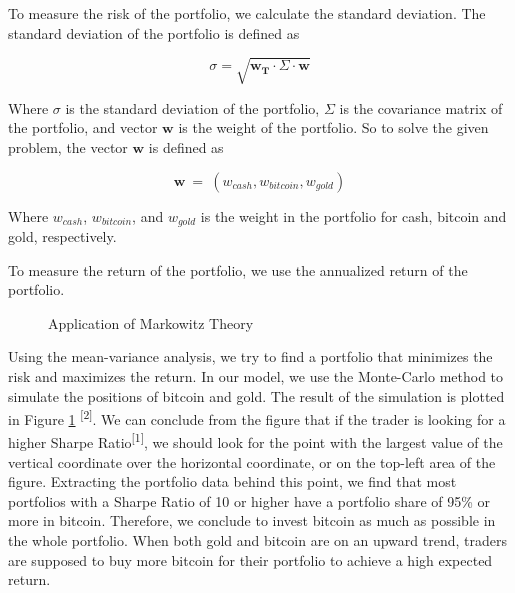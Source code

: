 \documentclass[12pt,a4paper]{article}
\begin{document}
\begin{spacing}{1.2}
To measure the risk of the portfolio, we calculate the standard deviation. The standard deviation of the portfolio is defined as

$$
	\sigma = \sqrt{\mathbf{w_T}  \cdot \Sigma \cdot \mathbf{w}}
$$

Where $\sigma$ is the standard deviation of the portfolio, $\Sigma$ is the covariance matrix of the portfolio, and vector $\mathbf{w}$ is the weight of the portfolio. So to solve the given problem, the vector $\mathbf{w}$ is defined as 

$$
\mathbf{w} \ = \ (w_{cash},w_{bitcoin},w_{gold})
$$

Where $w_{cash}$, $w_{bitcoin}$, and $w_{gold}$ is the weight in the portfolio for cash, bitcoin and gold, respectively. 

To measure the return of the portfolio, we use the annualized return of the portfolio.

\begin{figure}[H]
	\caption{Application of Markowitz Theory}
	\label{figure:markowiz}
\end{figure}

Using the mean-variance analysis, we try to find a portfolio that minimizes the risk and maximizes the return. In our model, we use the Monte-Carlo method to simulate the positions of bitcoin and gold. The result of the simulation is plotted in Figure \ref{figure:markowiz} \textsuperscript{[2]}.
We can conclude from the figure that if the trader is looking for a higher Sharpe Ratio\textsuperscript{[1]}, we should look for the point with the largest value of the vertical coordinate over the horizontal coordinate, or on the top-left area of the figure.
Extracting the portfolio data behind this point, we find that most portfolios with a Sharpe Ratio of 10 or higher have a portfolio share of 95\% or more in bitcoin.
Therefore, we conclude to invest bitcoin as much as possible in the whole portfolio. When both gold and bitcoin are on an upward trend, traders are supposed to buy more bitcoin for their portfolio to achieve a high expected return.



\end{spacing}
\end{document}
